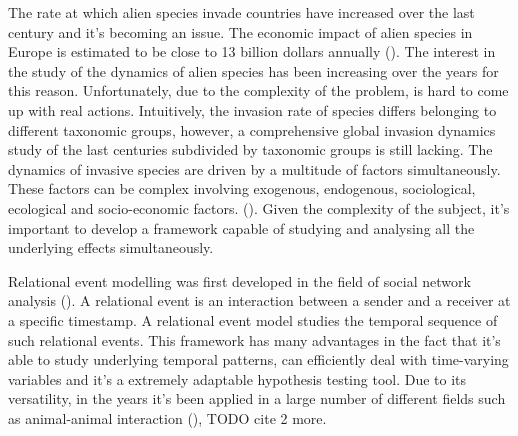 \documentclass[mscthesis]{usiinfthesis}
\begin{document}
The rate at which alien species invade countries have increased over the last century and it's becoming an issue. The economic impact of alien species in Europe is estimated to be close to 13 billion dollars annually (\cite{intro:rate}). The interest in the study of the dynamics of alien species has been increasing over the years for this reason. Unfortunately, due to the complexity of the problem, is hard to come up with real actions. Intuitively, the invasion rate of species differs belonging to different taxonomic groups, however, a comprehensive global invasion dynamics study of the last centuries subdivided by taxonomic groups is still lacking. The dynamics of invasive species are driven by a multitude of factors simultaneously. These factors can be complex involving exogenous, endogenous, sociological, ecological and socio-economic factors. (\cite{intro:factors}). Given the complexity of the subject, it's important to develop a framework capable of studying and analysing all the underlying effects simultaneously. 

Relational event modelling was first developed in the field of social network analysis (\cite{rem:butts}). A relational event is an interaction between a sender and a receiver at a specific timestamp. A relational event model studies the temporal sequence of such relational events. This framework has many advantages in the fact that it's able to study underlying temporal patterns, can efficiently deal with time-varying variables and it's a extremely adaptable hypothesis testing tool. Due to its versatility, in the years it's been applied in a large number of different fields such as animal-animal interaction (\citet{intro:cattle}), TODO cite 2 more.

%
\end{document}
